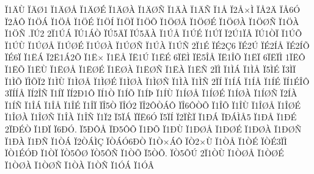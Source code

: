 {^^cf1^^c4^^d9
^^cf^^c4^^d81
^^cf1^^c4^^d8^^c5
^^cf1^^c4^^d8^^c9
^^cf1^^c4^^d8^^c0
^^cf1^^c4^^d8^^d1
^^cf1^^c4^^c0
^^cf1^^c4^^d1
^^cf1^^c5
^^cf2^^c5^^d7^^cc
^^cf^^c52^^c4
^^cf^^c56^^d3
^^cf2^^c5^^d4
^^cf1^^d6^^c1
^^cf1^^d6^^c5
^^cf1^^d6^^c9
^^cf1^^d6^^cd
^^cf1^^d6^^cf
^^cf1^^d6^^d5
^^cf1^^d6^^d8^^c5
^^cf1^^d6^^d8^^c9
^^cf1^^d6^^d8^^c0
^^cf1^^d6^^d8^^d1
^^cf1^^d6^^c0
^^cf1^^d6^^d1
.^^cf^^da2
2^^cf1^^da^^c1
^^cf^^da1^^c1^^d2
^^cf^^da5^^c4^^cf
^^cf^^da5^^c4^^c0
^^cf1^^da^^c5
^^cf1^^da^^c9
^^cf1^^da^^cf
^^cf2^^da1^^cf^^c2
^^cf^^da1^^d2^^cf
^^cf1^^da^^d5
^^cf1^^da^^d9
^^cf1^^da^^d8^^c5
^^cf1^^da^^d8^^c9
^^cf1^^da^^d8^^c0
^^cf1^^da^^d8^^d1
^^cf1^^da^^c0
^^cf1^^da^^d1
2^^cf1^^c9
^^cf^^c92^^c76
^^cf^^c92^^da
^^cf^^c92^^cd^^c5
^^cf^^c92^^cd^^d5
^^cf^^c96^^cf
^^cf1^^cb^^c1
^^cf2^^cb1^^c12^^d5
^^cf1^^cb^^d7
^^cf1^^cb^^c5
^^cf^^cb1^^da
^^cf1^^cb^^c9
6^^cf^^cb^^cc
^^cf^^cb5^^ce^^c5
^^cf^^cb1^^ce^^d5
^^cf1^^cb^^cf
6^^cf^^cb^^cf^^cc
1^^cf^^cb^^d4
^^cf1^^cb^^d5
^^cf1^^cb^^d9
^^cf1^^cb^^d8^^c5
^^cf1^^cb^^d8^^c9
^^cf1^^cb^^d8^^c0
^^cf1^^cb^^d8^^d1
^^cf1^^cb^^c0
^^cf1^^cb^^d1
2^^cf^^cc
^^cf1^^cc^^c1
^^cf1^^cc^^c5
^^cf5^^cc^^c9
^^cf3^^cc^^cf
^^cf1^^cc^^d5
^^cf^^cc^^d5^^cf2
^^cf1^^cc^^d9
^^cf1^^cc^^d8^^c5
^^cf1^^cc^^d8^^c9
^^cf1^^cc^^d8^^c0
^^cf1^^cc^^d8^^d1
^^cf1^^cc^^c0
^^cf1^^cc^^d1
2^^cf^^cd
^^cf1^^cd^^c1
^^cf1^^cd^^c5
^^cf1^^cd^^c9
^^cf^^cd1^^c9^^ce^^d4
3^^cf^^cd^^cd^^c5
^^cf^^cd2^^ce^^d1
^^cf1^^cd^^cf
^^cf^^cd2^^d01^^d4
^^cf^^cd1^^d2
^^cf1^^cd^^d5
^^cf1^^cd^^de
^^cf1^^cd^^d9
^^cf1^^cd^^d8^^c5
^^cf1^^cd^^d8^^c9
^^cf1^^cd^^d8^^c0
^^cf1^^cd^^d8^^d1
^^cf2^^cd^^c0
^^cf1^^cd^^d1
^^cf1^^ce^^c1
^^cf1^^ce^^c5
^^cf1^^ce^^c9
^^cf1^^ce^^cf
^^cf^^ce5^^d2
^^cf^^ce^^d32
^^cf^^ce2^^d4^^d2^^c1^^d4
^^cf^^ce6^^d4^^d2^^d5
^^cf1^^ce^^d5
^^cf1^^ce^^d9
^^cf1^^ce^^d8^^c5
^^cf1^^ce^^d8^^c9
^^cf1^^ce^^d8^^c0
^^cf1^^ce^^d8^^d1
^^cf1^^ce^^c0
^^cf1^^ce^^d1
^^cf1^^cf2
^^cf5^^cf^^c1
^^cf^^cf^^cb6^^d3
^^cf5^^cf^^cd
^^cf2^^cf^^c8^^cf
^^cf1^^d0^^c1
^^cf^^d0^^c1^^cc^^c55
^^cf1^^d0^^c5
^^cf1^^d0^^c9
2^^cf^^d0^^c9^^d2
^^cf1^^d0^^cf
^^cf6^^d0^^d3.
^^cf5^^d0^^d4^^c5
^^cf^^d05^^d4^^d5
^^cf1^^d0^^d5
^^cf1^^d0^^d9
^^cf1^^d0^^d8^^c5
^^cf1^^d0^^d8^^c9
^^cf1^^d0^^d8^^c0
^^cf1^^d0^^d8^^d1
^^cf1^^d0^^c0
^^cf1^^d0^^d1
^^cf1^^d2^^c1
^^cf2^^d2^^c1^^cc^^c7
^^cf^^d2^^c1^^d36^^d0^^d2
^^cf1^^d2^^d7^^c1^^d4
^^cf^^d22^^d7^^d9
^^cf1^^d2^^c5
^^cf1^^d2^^c9
^^cf^^d2^^c93^^cf^^cc
^^cf^^d21^^c9^^d3^^d0
^^cf1^^d2^^cf
^^cf^^d25^^d4^^d8
^^cf^^d25^^d4^^d1
^^cf1^^d2^^d5
^^cf5^^d2^^d5.
^^cf^^d25^^d5^^da
2^^cf1^^d2^^d9
^^cf1^^d2^^d8^^c5
^^cf1^^d2^^d8^^c9
^^cf1^^d2^^d8^^c0
^^cf1^^d2^^d8^^d1
^^cf1^^d2^^c0
^^cf1^^d2^^d1
^^cf1^^d3^^c1
^^cf1^^d3^^c2
}
